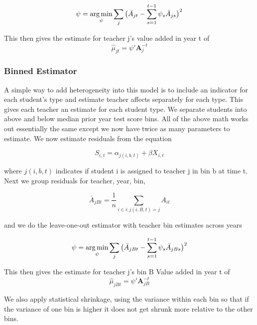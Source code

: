 \documentclass[12pt]{article}
\theoremstyle{definition}
\theoremstyle{definition}
\theoremstyle{definition}
\theoremstyle{definition}
\begin{document}
    \begin{equation}
        \psi = \operatorname*{arg\,min}_{\psi} \sum_j \big(  \bar{A}_{jt} - \sum_{s = 1}^{t-1} \psi_s \bar{A}_{js} \big)^2
    \end{equation}

    This then gives the estimate for teacher j's value added in year t of 
    \begin{equation}
        \hat{\mu}_{jt} = \psi'\mathbf{A}_j^{-t}
    \end{equation}

    \subsubsection{Binned Estimator}
    A simple way to add heterogeneity into this model is to include an indicator for each student's type and estimate teacher affects separately for each type. This gives each teacher an estimate for each student type. We separate students into above and below median prior year test score bins. All of the above math works out essentially the same except we now have twice as many parameters to estimate. We now estimate residuals from the equation

     \begin{equation}
        S_{i,t} = \alpha_{j(i,b, t)} + \beta X_{i, t}
    \end{equation}

    where $j(i,b, t)$ indicates if student i is assigned to teacher j in bin b at time t. Next we group residuals for teacher, year, bin, 

    \begin{equation}
        \bar{A}_{jBt} = \frac{1}{n} \sum_{i \in {i: j(i, B, t) = j}} A_{it}
    \end{equation}

    and we do the leave-one-out estimator with teacher bin estimates across years 

    \begin{equation}
        \psi = \operatorname*{arg\,min}_{\psi} \sum_j \big(  \bar{A}_{jBt} - \sum_{s = 1}^{t-1} \psi_s \bar{A}_{jBs} \big)^2
    \end{equation}

    This then gives the estimate for teacher j's  bin B Value added in year t of 
    \begin{equation}
        \hat{\mu}_{jBt} = \psi'\mathbf{A}_{jB}^{-t}
    \end{equation}

    We also apply statistical shrinkage, using the variance within each bin so that if the variance of one bin is higher it does not get shrunk more relative to the other bins. 
\end{document}
